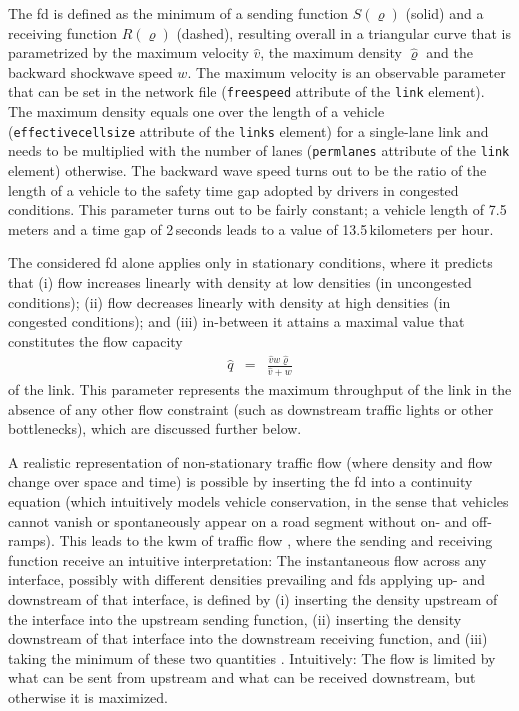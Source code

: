 The \gls{fd} is defined as the minimum of a sending function $S(\varrho)$
(solid) and a receiving function $R(\varrho)$ (dashed), resulting
overall in a triangular curve that is parametrized by the maximum
velocity $\hat{v}$, the maximum density $\hat{\varrho}$ and the
backward shockwave speed $w$. The maximum velocity is an observable
parameter that can be set in the network file (\texttt{freespeed}
attribute of the \texttt{link} element). The maximum density equals
one over the length of a vehicle (\texttt{effectivecellsize} attribute
of the \texttt{links} element) for a single-lane link and needs to
be multiplied with the number of lanes (\texttt{permlanes} attribute
of the \texttt{link} element) otherwise. The backward wave speed turns
out to be the ratio of the length of a vehicle to the safety time
gap adopted by drivers in congested conditions. This parameter turns
out to be fairly constant; a vehicle length of 7.5\,meters and a time
gap of 2\,seconds leads to a value of 13.5\,kilometers per hour. 

The considered \gls{fd} alone applies only in stationary conditions, where
it predicts that (i) flow increases linearly with density at low densities
(\ie in uncongested conditions); (ii) flow decreases linearly with
density at high densities (\ie in congested conditions); and (iii)
in-between it attains a maximal value that constitutes the flow capacity
\begin{eqnarray}
\hat{q} & = & \frac{\hat{v}w\hat{\varrho}}{\hat{v}+w}\label{eq:flow-cap}
\end{eqnarray}
 of the link. This parameter represents the maximum throughput of
the link in the absence of any other flow constraint (such as downstream
traffic lights or other bottlenecks), which are discussed further
below.

A realistic representation of non-stationary traffic flow (where density
and flow change over space and time) is possible by inserting the
\gls{fd} into a continuity equation (which intuitively models vehicle conservation,
in the sense that vehicles cannot vanish or spontaneously appear on
a road segment without on- and off-ramps). This leads to the \gls{kwm} 
of traffic flow \citep[KWM;][]{lighthill-1955,richards-1956},
where the sending and receiving function receive an intuitive interpretation:
The instantaneous flow across any interface, possibly with different
densities prevailing and \glspl{fd} applying up- and downstream of that interface,
is defined by (i) inserting the density upstream of the interface
into the upstream sending function, (ii) inserting the density downstream
of that interface into the downstream receiving function, and (iii)
taking the minimum of these two quantities \citep{daganzo-1994,lebacque-1996}.
Intuitively: The flow is limited by what can be sent from upstream
and what can be received downstream, but otherwise it is maximized.

